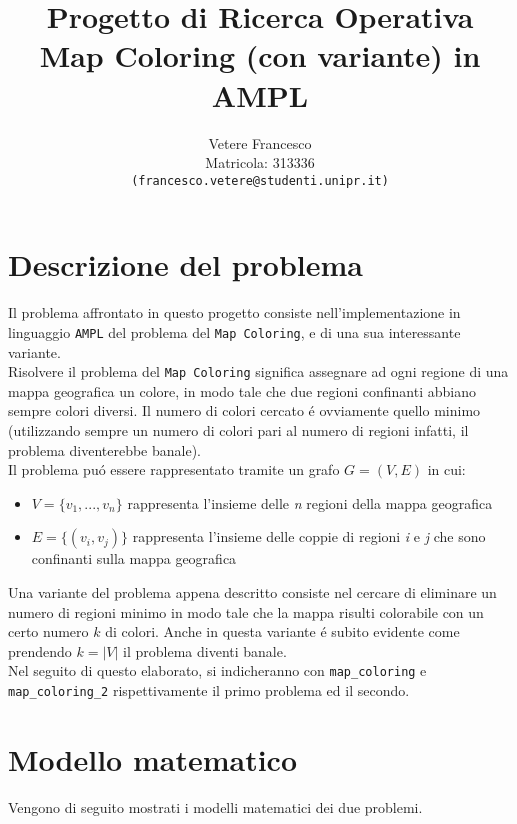 \documentclass{article}
\title{\textbf{Progetto di Ricerca Operativa} \\
	\large \textbf{Map Coloring (con variante) in AMPL} \\
}
\author{Vetere Francesco\\ Matricola: 313336 \\ \texttt{(francesco.vetere@studenti.unipr.it)}}
\date{}
\begin{document}
\maketitle
\tableofcontents

\pagebreak

\section{Descrizione del problema} 

Il problema affrontato in questo progetto consiste nell'implementazione in linguaggio \texttt{AMPL} del problema del \texttt{Map Coloring}, e di una sua interessante variante.\\
Risolvere il problema del \texttt{Map Coloring} significa assegnare ad ogni regione di una mappa geografica un colore, in modo tale che due regioni confinanti abbiano sempre colori diversi. Il numero di colori cercato \'e ovviamente quello minimo (utilizzando sempre un numero di colori pari al numero di regioni infatti, il problema diventerebbe banale).\\
Il problema pu\'o essere rappresentato tramite un grafo $G = (V, E)$ in cui:
\begin{itemize}
\item $V=\{v_{1},...,v_{n}\}$ rappresenta l'insieme delle \emph{n} regioni della mappa geografica
\item $E=\{(v_{i}, v_{j})\}$ rappresenta l'insieme delle coppie di regioni \emph{i} e \emph{j} che sono confinanti sulla mappa geografica\\
\end{itemize}

Una variante del problema appena descritto consiste nel cercare di eliminare un numero di regioni minimo in modo tale che la mappa risulti colorabile con un certo numero $k$ di colori. Anche in questa variante \'e subito evidente come prendendo $k = |V|$ il problema diventi banale.\\

Nel seguito di questo elaborato, si indicheranno con \texttt{map\_coloring} e \texttt{map\_coloring\_2} rispettivamente il primo problema ed il secondo.
\pagebreak

\section{Modello matematico}
Vengono di seguito mostrati i modelli matematici dei due problemi.\\
\end{document}
